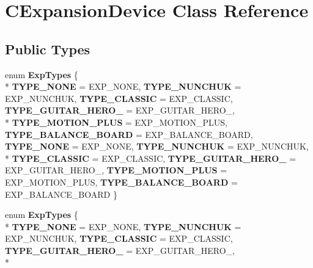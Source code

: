\hypertarget{class_c_expansion_device}{\section{C\-Expansion\-Device Class Reference}
\label{class_c_expansion_device}
}
\subsection*{Public Types}
\begin{DoxyCompactItemize}
\item 
enum {\bfseries Exp\-Types} \{ \\*
{\bfseries T\-Y\-P\-E\-\_\-\-N\-O\-N\-E} =  E\-X\-P\-\_\-\-N\-O\-N\-E, 
{\bfseries T\-Y\-P\-E\-\_\-\-N\-U\-N\-C\-H\-U\-K} =  E\-X\-P\-\_\-\-N\-U\-N\-C\-H\-U\-K, 
{\bfseries T\-Y\-P\-E\-\_\-\-C\-L\-A\-S\-S\-I\-C} =  E\-X\-P\-\_\-\-C\-L\-A\-S\-S\-I\-C, 
{\bfseries T\-Y\-P\-E\-\_\-\-G\-U\-I\-T\-A\-R\-\_\-\-H\-E\-R\-O\-\_} =  E\-X\-P\-\_\-\-G\-U\-I\-T\-A\-R\-\_\-\-H\-E\-R\-O\-\_, 
\\*
{\bfseries T\-Y\-P\-E\-\_\-\-M\-O\-T\-I\-O\-N\-\_\-\-P\-L\-U\-S} =  E\-X\-P\-\_\-\-M\-O\-T\-I\-O\-N\-\_\-\-P\-L\-U\-S, 
{\bfseries T\-Y\-P\-E\-\_\-\-B\-A\-L\-A\-N\-C\-E\-\_\-\-B\-O\-A\-R\-D} =  E\-X\-P\-\_\-\-B\-A\-L\-A\-N\-C\-E\-\_\-\-B\-O\-A\-R\-D, 
{\bfseries T\-Y\-P\-E\-\_\-\-N\-O\-N\-E} =  E\-X\-P\-\_\-\-N\-O\-N\-E, 
{\bfseries T\-Y\-P\-E\-\_\-\-N\-U\-N\-C\-H\-U\-K} =  E\-X\-P\-\_\-\-N\-U\-N\-C\-H\-U\-K, 
\\*
{\bfseries T\-Y\-P\-E\-\_\-\-C\-L\-A\-S\-S\-I\-C} =  E\-X\-P\-\_\-\-C\-L\-A\-S\-S\-I\-C, 
{\bfseries T\-Y\-P\-E\-\_\-\-G\-U\-I\-T\-A\-R\-\_\-\-H\-E\-R\-O\-\_} =  E\-X\-P\-\_\-\-G\-U\-I\-T\-A\-R\-\_\-\-H\-E\-R\-O\-\_, 
{\bfseries T\-Y\-P\-E\-\_\-\-M\-O\-T\-I\-O\-N\-\_\-\-P\-L\-U\-S} =  E\-X\-P\-\_\-\-M\-O\-T\-I\-O\-N\-\_\-\-P\-L\-U\-S, 
{\bfseries T\-Y\-P\-E\-\_\-\-B\-A\-L\-A\-N\-C\-E\-\_\-\-B\-O\-A\-R\-D} =  E\-X\-P\-\_\-\-B\-A\-L\-A\-N\-C\-E\-\_\-\-B\-O\-A\-R\-D
 \}
\item 
enum {\bfseries Exp\-Types} \{ \\*
{\bfseries T\-Y\-P\-E\-\_\-\-N\-O\-N\-E} =  E\-X\-P\-\_\-\-N\-O\-N\-E, 
{\bfseries T\-Y\-P\-E\-\_\-\-N\-U\-N\-C\-H\-U\-K} =  E\-X\-P\-\_\-\-N\-U\-N\-C\-H\-U\-K, 
{\bfseries T\-Y\-P\-E\-\_\-\-C\-L\-A\-S\-S\-I\-C} =  E\-X\-P\-\_\-\-C\-L\-A\-S\-S\-I\-C, 
{\bfseries T\-Y\-P\-E\-\_\-\-G\-U\-I\-T\-A\-R\-\_\-\-H\-E\-R\-O\-\_} =  E\-X\-P\-\_\-\-G\-U\-I\-T\-A\-R\-\_\-\-H\-E\-R\-O\-\_, 
\\*

\end{DoxyCompactItemize}
